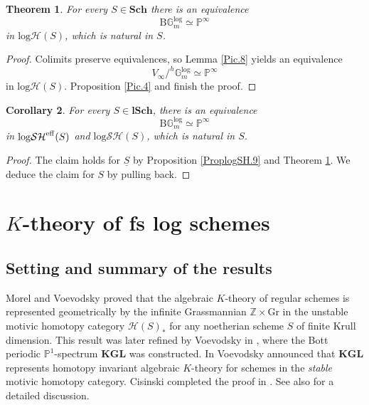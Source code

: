 \documentclass[11pt, a4paper]{amsart}
\newtheorem{thm}{Theorem}[subsection]
\newtheorem{cor}[thm]{Corollary}
\theoremstyle{definition}
\numberwithin{equation}{subsection}
\newcommand{\Z}{\mathbb{Z}}
\renewcommand{\P}{\mathbb{P}}
\newcommand{\Sch}{\mathbf{Sch}}
\newcommand{\lSch}{\mathbf{lSch}}
\newcommand{\Gr}{{\mathrm{Gr}}}
\newcommand{\KGL}{{\mathbf{KGL}}}
\renewcommand{\ul}{\underline}
\newcommand{\clspace}{\mathrm{B}}
\newcommand{\Gmm}{\mathbb{G}_m^{\mathrm{log}}}
\newcommand{\cptsph}[1]{V_{#1}}
\newcommand{\eff}{{\rm eff}}
\newcommand{\inflogH}{\mathrm{log}\mathcal{H}}
\newcommand{\inflogSH}{\mathrm{log}\mathcal{SH}}
\begin{document}
\begin{thm}
\label{Pic.9}
For every $S\in \Sch$ there is an equivalence
\[
\clspace \Gmm \simeq \P^\infty
\]
in $\inflogH(S)$,
which is natural in $S$.
\end{thm}
\begin{proof}
Colimits preserve equivalences, so Lemma \ref{Pic.8} yields an equivalence
\begin{equation}
\label{Pic.9.1}
\cptsph{\infty}/^h \Gmm
\simeq
\P^\infty
\end{equation}
in $\inflogH(S)$.
Proposition \ref{Pic.4} and \cite[Proposition 2.14, p.\ 74]{MV} finish the proof.
\end{proof}

\begin{cor}\label{Pic.10}
For every $S\in \lSch$,
there is an equivalence
\[
\clspace \Gmm \simeq \P^\infty
\]
in $\inflogSH^\eff(S)$ and $\inflogSH(S)$,
which is natural in $S$.
\end{cor}
\begin{proof}
The claim holds for $\ul{S}$ by Proposition \ref{ProplogSH.9} and Theorem \ref{Pic.9}.
We deduce the claim for $S$ by pulling back.
\end{proof}

\newpage




\section{\texorpdfstring{$K$}{K}-theory of fs log schemes}
\label{section:kfslogschemes}
\subsection{Setting and summary of the results}
Morel and Voevodsky \cite[Propositions 3.7 and 3.9]{MV} proved that the algebraic $K$-theory of regular schemes is represented 
geometrically by the infinite Grassmannian $\Z\times \Gr$ in the unstable motivic homotopy category $\mathcal{H}(S)_\ast$ for any noetherian scheme $S$ of finite Krull dimension. This result was later refined by Voevodsky in \cite{zbMATH01194164}, where the Bott periodic $\P^1$-spectrum $\KGL$ was constructed. In \cite{zbMATH01194164} Voevodsky announced that $\KGL$
 represents homotopy invariant algebraic $K$-theory for  schemes in the \emph{stable} motivic homotopy category.
Cisinski completed the proof in \cite[Th\'eor\`eme 2.20]{zbMATH06156613}. See also \cite{PPR} for a detailed discussion.
\end{document}
